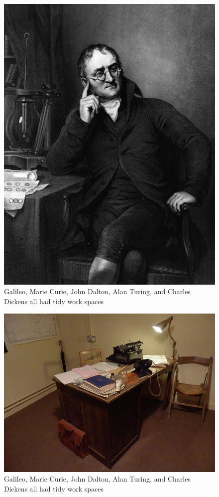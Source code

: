 \documentclass[
]{book}
\begin{document}
\begin{figure}
\includegraphics[width=6.28in]{imgs/Dalton_John_desk} \caption{\label{fig:figs}Galileo, Marie Curie, John Dalton, Alan Turing, and Charles Dickens all had tidy work spaces}\label{fig:unnamed-chunk-3-3}
\end{figure}
\begin{figure}
\includegraphics[width=6.94in]{imgs/alan_turing_desk} \caption{\label{fig:figs}Galileo, Marie Curie, John Dalton, Alan Turing, and Charles Dickens all had tidy work spaces}\label{fig:unnamed-chunk-3-4}
\end{figure}
\end{document}
